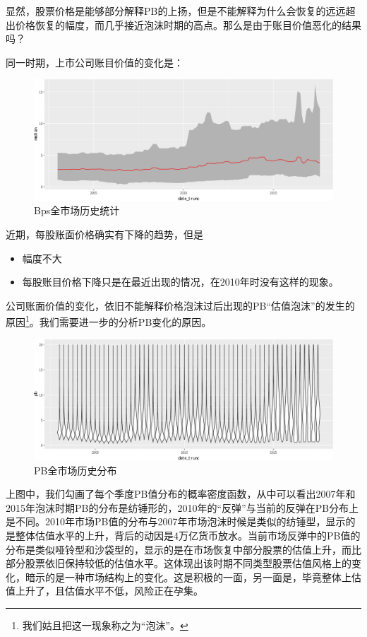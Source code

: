 \documentclass[hyperref,]{ctexart}
\providecommand{\tightlist}{%
  \setlength{\itemsep}{0pt}\setlength{\parskip}{0pt}}
\begin{document}
显然，股票价格是能够部分解释PB的上扬，但是不能解释为什么会恢复的远远超出价格恢复的幅度，而几乎接近泡沫时期的高点。那么是由于账目价值恶化的结果吗？

同一时期，上市公司账目价值的变化是：

\begin{figure}[htbp]
\centering
\includegraphics{PB-ROE_files/figure-latex/unnamed-chunk-4-1.pdf}
\caption{Bps全市场历史统计}
\end{figure}

近期，每股账面价格确实有下降的趋势，但是

\begin{itemize}
\tightlist
\item
  幅度不大
\item
  每股账目价格下降只是在最近出现的情况，在2010年时没有这样的现象。
\end{itemize}

公司账面价值的变化，依旧不能解释价格泡沫过后出现的PB``估值泡沫''的发生的原因\footnote{我们姑且把这一现象称之为“泡沫”。}。我们需要进一步的分析PB变化的原因。

\begin{figure}[htbp]
\centering
\includegraphics{PB-ROE_files/figure-latex/unnamed-chunk-5-1.pdf}
\caption{PB全市场历史分布}
\end{figure}

上图中，我们勾画了每个季度PB值分布的概率密度函数，从中可以看出2007年和2015年泡沫时期PB的分布是纺锤形的，2010年的``反弹''与当前的反弹在PB分布上是不同。2010年市场PB值的分布与2007年市场泡沫时候是类似的纺锤型，显示的是整体估值水平的上升，背后的动因是4万亿货币放水。当前市场反弹中的PB值的分布是类似哑铃型和沙袋型的，显示的是在市场恢复中部分股票的估值上升，而比部分股票依旧保持较低的估值水平。这体现出该时期不同类型股票估值风格上的变化，暗示的是一种市场结构上的变化。这是积极的一面，另一面是，毕竟整体上估值上升了，且估值水平不低，风险正在孕集。
\end{document}
